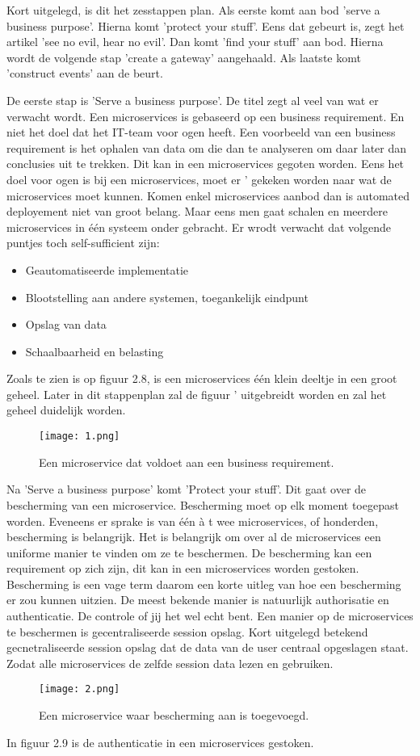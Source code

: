 Kort uitgelegd, is dit het zesstappen plan. Als eerste komt aan bod 'serve a business purpose'. Hierna komt 'protect your stuff'. Eens dat gebeurt is, zegt het artikel 'see no evil, hear no evil'. Dan komt 'find your stuff' aan bod. Hierna wordt de volgende stap 'create a gateway' aangehaald. Als laatste komt 'construct events' aan de beurt.

De eerste stap is 'Serve a business purpose'. De titel zegt al veel van wat er verwacht wordt. Een microservices is gebaseerd op een business requirement. En niet het doel dat het IT-team voor ogen heeft. Een voorbeeld van een business requirement is het ophalen van data om die dan te analyseren om daar later dan conclusies uit te trekken. Dit kan in een microservices gegoten worden. Eens het doel voor ogen is bij een microservices, moet er ' gekeken worden naar wat de microservices moet kunnen. Komen enkel microservices aanbod dan is automated deployement niet van groot belang. Maar eens men gaat schalen en meerdere microservices in één systeem onder gebracht. Er wrodt verwacht dat volgende puntjes toch self-sufficient zijn:
\begin{itemize}
	\item Geautomatiseerde implementatie
	\item Blootstelling aan andere systemen, toegankelijk eindpunt
	\item Opslag van data
	\item Schaalbaarheid en belasting
\end{itemize}
Zoals te zien is op figuur 2.8, is een microservices één klein deeltje in een groot geheel. Later in dit stappenplan zal de figuur ' uitgebreidt worden en zal het geheel duidelijk worden. 
\begin{figure}[h]
	\texttt{[image: 1.png]}
	\caption{Een microservice dat voldoet aan een business requirement. \textcite{Benetis2016}}
	\centering
\end{figure}

Na 'Serve a business purpose' komt 'Protect your stuff'. Dit gaat over de bescherming van een microservice. Bescherming moet op elk moment toegepast worden. Eveneens er sprake is van één à t wee microservices, of honderden, bescherming is belangrijk. Het is belangrijk om over al de microservices een uniforme manier te vinden om ze te beschermen. De bescherming kan een requirement op zich zijn, dit kan in een microservices worden gestoken. Bescherming is een vage term daarom een korte uitleg van hoe een bescherming er zou kunnen uitzien. De meest bekende manier is natuurlijk authorisatie en authenticatie.  De controle of jij het  wel echt bent. Een manier op de microservices te beschermen is gecentraliseerde session opslag. Kort uitgelegd betekend gecnetraliseerde session opslag dat de data van de user centraal opgeslagen staat. Zodat alle microservices de zelfde session data lezen en gebruiken. 
\begin{figure}[h]
	\texttt{[image: 2.png]}
	\caption{Een microservice waar bescherming aan is toegevoegd. \textcite{Benetis2016}}
	\centering
\end{figure}
In figuur 2.9 is de authenticatie in een microservices gestoken. 

